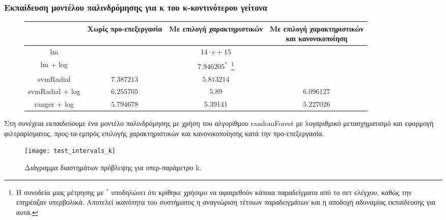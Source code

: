 \subsubsection{Εκπαίδευση μοντέλου παλινδρόμησης για κ του κ-κοντινότερου γείτονα} \label{section:HPPk}
\begin{figure}[!htb]
	\footnotesize
	\begin{center}
		\begin{tabular}{ |c|c|c|c| } 
			\hline
			& Χωρίς προ-επεξεργασία & Με επιλογή χαρακτηριστικών & \pbox{20cm}{Με επιλογή χαρακτηριστικών\\ και κανονικοποίηση} \\
			\hline
			lm &  & $14 \cdot e+15$ &   \\
			\hline
			lm + log & & $7.946205 ^{*}$~\footnote{Η συνοδεία μιας μέτρησης με $^*$ υποδηλώνει ότι κρίθηκε χρήσιμο να αφαιρεθούν κάποια παραδείγματα από το σετ ελέγχου, καθώς την επηρέαζαν υπερβολικά. Αποτελεί ικανότητα του συστήματος η αναγνώριση τέτοιων παραδειγμάτων και η αποδοχή αδυναμίας εκπαίδευσης για αυτά. }& \\
			\hline
			svmRadial & $7.387213$ &$5.813214$& \\
			\hline
			svmRadial + log& $6.255705$ & $5.89$& $6.096127$\\
			\hline
			ranger + log  & $5.794678$ & 5.39141 & $5.227026$\\
			\hline
		\end{tabular}   
	\end{center}
\end{figure}

Στη συνέχεια εκπαιδεύουμε ένα μοντέλο παλινδρόμησης με χρήση του αλγορίθμου randomForest με λογαριθμικό μετασχηματισμό και εφαρμογή φιλτραρίσματος, προς-τα-εμπρός επιλογής χαρακτηριστικών και κανονικοποίησης κατά την προ-επεξεργασία.

\begin{figure}[!htb]
	\texttt{[image: test\_intervals\_k]}
		\caption[Διάγραμμα διαστημάτων πρόβλεψης για υπερ-παράμετρο decay]{Διάγραμμα διαστημάτων πρόβλεψης για υπερ-παράμετρο k.}	
	\label{fig:high} 
\end{figure}
\FloatBarrier
